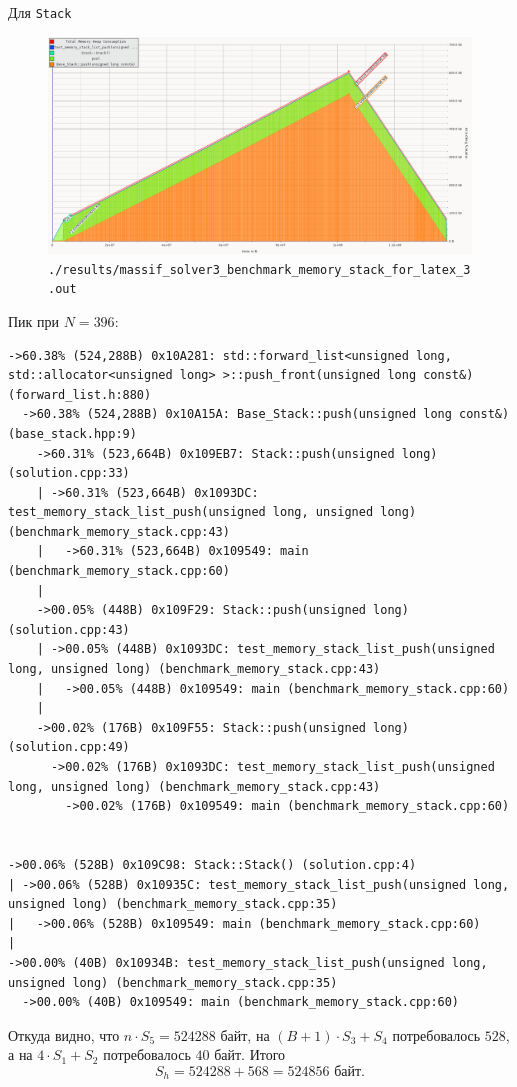 Для \texttt{Stack}
\begin{figure}[H]
  \centering
  \includegraphics[width=1.0\textwidth]{../../resources/memory_consumption_of_solver3_benchmark_memory_stack_with_forward_list_1.png}
  \caption{\texttt{./results/massif_solver3_benchmark_memory_stack_for_latex_3.out}}
\end{figure}
Пик при \(N = 396\):
\begin{lstlisting}[caption={}, label={}, style=style_code_block]
->60.38% (524,288B) 0x10A281: std::forward_list<unsigned long, std::allocator<unsigned long> >::push_front(unsigned long const&) (forward_list.h:880)
  ->60.38% (524,288B) 0x10A15A: Base_Stack::push(unsigned long const&) (base_stack.hpp:9)
    ->60.31% (523,664B) 0x109EB7: Stack::push(unsigned long) (solution.cpp:33)
    | ->60.31% (523,664B) 0x1093DC: test_memory_stack_list_push(unsigned long, unsigned long) (benchmark_memory_stack.cpp:43)
    |   ->60.31% (523,664B) 0x109549: main (benchmark_memory_stack.cpp:60)
    |     
    ->00.05% (448B) 0x109F29: Stack::push(unsigned long) (solution.cpp:43)
    | ->00.05% (448B) 0x1093DC: test_memory_stack_list_push(unsigned long, unsigned long) (benchmark_memory_stack.cpp:43)
    |   ->00.05% (448B) 0x109549: main (benchmark_memory_stack.cpp:60)
    |     
    ->00.02% (176B) 0x109F55: Stack::push(unsigned long) (solution.cpp:49)
      ->00.02% (176B) 0x1093DC: test_memory_stack_list_push(unsigned long, unsigned long) (benchmark_memory_stack.cpp:43)
        ->00.02% (176B) 0x109549: main (benchmark_memory_stack.cpp:60)
          

->00.06% (528B) 0x109C98: Stack::Stack() (solution.cpp:4)
| ->00.06% (528B) 0x10935C: test_memory_stack_list_push(unsigned long, unsigned long) (benchmark_memory_stack.cpp:35)
|   ->00.06% (528B) 0x109549: main (benchmark_memory_stack.cpp:60)
|     
->00.00% (40B) 0x10934B: test_memory_stack_list_push(unsigned long, unsigned long) (benchmark_memory_stack.cpp:35)
  ->00.00% (40B) 0x109549: main (benchmark_memory_stack.cpp:60)
\end{lstlisting}
Откуда видно, что \(n \cdot S_5 =524288\) байт, на \((B + 1)\cdot S_3 + S_4\) потребовалось \(528\), а на \(4\cdot S_1 + S_2\) потребовалось \(40\) байт.
Итого
\begin{dmath*}
  S_h = 524288 + 568 = 524856 \text{ байт.}
\end{dmath*}

